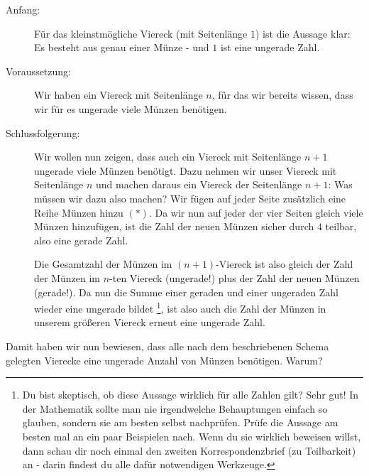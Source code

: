 \documentclass[a4paper,ngerman,12pt]{scrartcl}
\theoremstyle{definition}
\theoremstyle{plain}
\theoremstyle{remark}
\begin{document}
\begin{description}
	\item[Anfang:] Für das kleinstmögliche Viereck (mit Seitenlänge $1$) ist die Aussage klar: Es besteht aus genau einer Münze - und $1$ ist eine ungerade Zahl.
	\item[Voraussetzung:] Wir haben ein Viereck mit Seitenlänge $n$, für das wir bereits wissen, dass wir für es ungerade viele Münzen benötigen.
	\item[Schlussfolgerung:] Wir wollen nun zeigen, dass auch ein Viereck mit Seitenlänge $n+1$ ungerade viele Münzen benötigt. Dazu nehmen wir unser Viereck mit Seitenlänge $n$ und machen daraus ein Viereck der Seitenlänge $n+1$:
	Was müssen wir dazu also machen? Wir fügen auf jeder Seite zusätzlich eine Reihe Münzen hinzu $(\ast)$. Da wir nun auf jeder der vier Seiten gleich viele Münzen hinzufügen, ist die Zahl der neuen Münzen sicher durch $4$ teilbar, also eine gerade Zahl.
	
	Die Gesamtzahl der Münzen im $(n+1)$-Viereck ist also gleich der Zahl der Münzen im $n$-ten Viereck (ungerade!) plus der Zahl der neuen Münzen (gerade!). Da nun die Summe einer geraden und einer ungeraden Zahl wieder eine ungerade bildet
	\footnote{Du bist skeptisch, ob diese Aussage wirklich für alle Zahlen gilt? Sehr gut! In der Mathematik sollte man nie irgendwelche Behauptungen einfach so glauben, sondern sie am besten selbst nachprüfen. Prüfe die Aussage am besten mal an ein paar Beispielen nach. Wenn du sie wirklich beweisen willst, dann schau dir noch einmal den zweiten Korrespondenzbrief (zu Teilbarkeit) an - darin findest du alle dafür notwendigen Werkzeuge.},
	ist also auch die Zahl der Münzen in unserem größeren Viereck erneut eine ungerade Zahl.
\end{description}

Damit haben wir nun bewiesen, dass alle nach dem beschriebenen Schema gelegten Vierecke eine ungerade Anzahl von Münzen benötigen. Warum?
\end{document}
